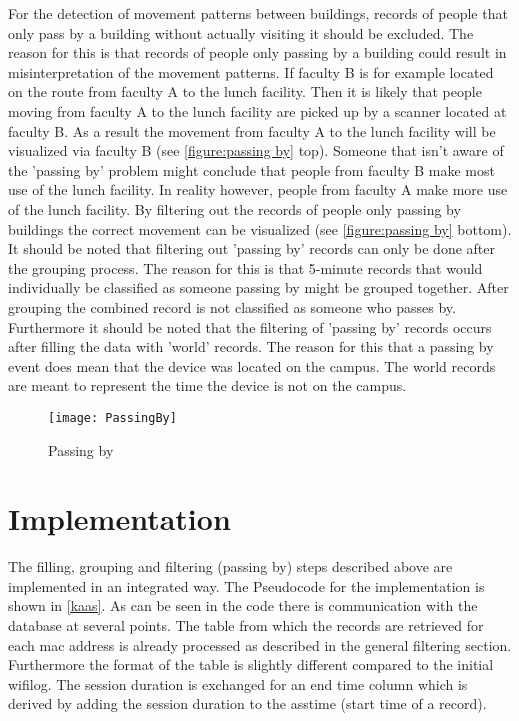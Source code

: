 For the detection of movement patterns between buildings, records of people that only pass by a building without actually visiting it should be excluded. The reason for this is that records of people only passing by a building could result in misinterpretation of the movement patterns. If faculty B is for example located on the route from faculty A to the lunch facility. Then it is likely that people moving from faculty A to the lunch facility are picked up by a scanner located at faculty B. As a result the movement from faculty A to the lunch facility will be visualized via faculty B (see \autoref{figure:passing by} top). Someone that isn’t aware of the 'passing by' problem might conclude that people from faculty B make most use of the lunch facility. In reality however, people from faculty A make more use of the lunch facility. By filtering out the records of people only passing by buildings the correct movement can be visualized (see \autoref{figure:passing by} bottom). It should be noted that filtering out 'passing by' records can only be done after the grouping process. The reason for this is that 5-minute records that would individually be classified as someone passing by might be grouped together. After grouping the combined record is not classified as someone who passes by. Furthermore it should be noted that the filtering of 'passing by' records occurs after filling the data with 'world' records. The reason for this that a passing by event does mean that the device was located on the campus. The world records are meant to represent the time the device is not on the campus.

\begin{figure}[H]
\centering
\texttt{[image: PassingBy]}
\captionsetup{justification=centering}
\caption{Passing by}
\label{figure:passing by}
\end{figure}
\section{Implementation}
The filling, grouping and filtering (passing by) steps described above are implemented in an integrated way. The Pseudocode for the implementation is shown in \autoref{kaas}. As can be seen in the code there is communication with the database at several points. The table from which the records are retrieved for each mac address is already processed as described in the general filtering section. Furthermore the format of the table is slightly different compared to the initial wifilog. The session duration is exchanged for an end time column which is derived by adding the session duration to the asstime (start time of a record).

